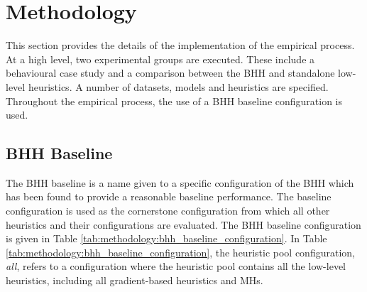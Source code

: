 \section{Methodology}
\label{sec:methodology}

This section provides the details of the implementation of the empirical process. At a high level, two experimental groups are executed. These include a behavioural case study and a comparison between the \acs{BHH} and standalone low-level heuristics. A number of datasets, models and heuristics are specified. Throughout the empirical process, the use of a \acs{BHH} baseline configuration is used.

\subsection{BHH Baseline}\label{sec:methodology:baseline_bhh}

The \acs{BHH} baseline is a name given to a specific configuration of the \acs{BHH} which has been found to provide a reasonable baseline performance. The baseline configuration is used as the cornerstone configuration from which all other heuristics and their configurations are evaluated. The \acs{BHH} baseline configuration is given in Table \ref{tab:methodology:bhh_baseline_configuration}. In Table \ref{tab:methodology:bhh_baseline_configuration}, the heuristic pool configuration, \textit{all}, refers to a configuration where the heuristic pool contains all the low-level heuristics, including all gradient-based heuristics and \acp{MH}.

